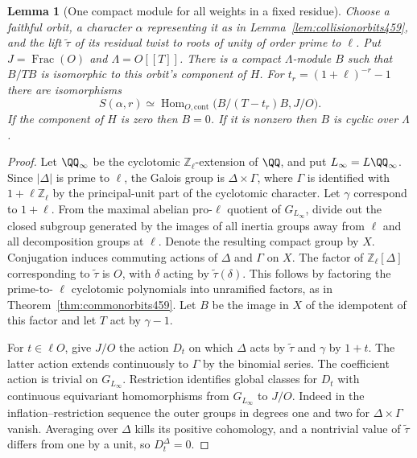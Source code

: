 \documentclass[a4paper,11pt]{article}
\newtheorem{lemma}[proposition]{Lemma}
\theoremstyle{definition}
\theoremstyle{remark}
\newcommand{\ZZ}{\mathbb Z}\newcommand{\ord}{\operatorname{ord}}
\numberwithin{equation}{section}
\begin{document}
\begin{lemma}[One compact module for all weights in a fixed residue]\leavevmode
\label{lem:collisionfamily464}
Choose a faithful orbit, a character \(\alpha\) representing it as
in Lemma~\ref{lem:collisionorbits459}, and the lift
\(\widetilde\tau\) of its residual twist to roots of unity of
order prime to \(\ell\). Put \(J=\operatorname{Frac}(O)\) and
\(\Lambda=O[[T]]\). There is a compact \(\Lambda\)-module \(B\)
such that \(B/TB\) is isomorphic to this orbit's component of
\(H\). For \(t_r=(1+\ell)^{-r}-1\) there are isomorphisms
\[
  S(\alpha,r)\simeq
       \operatorname{Hom}_{O,\mathrm{cont}}
                 \bigl(B/(T-t_r)B,J/O\bigr).
\]
If the component of \(H\) is zero then \(B=0\). If it is nonzero
then \(B\) is cyclic over \(\Lambda\).
\end{lemma}
\begin{proof}
Let \(\QQ_\infty\) be the cyclotomic \(\ZZ_\ell\)-extension of
\(\QQ\), and put \(L_\infty=L\QQ_\infty\). Since \(|\Delta|\) is
prime to \(\ell\), the Galois group is
\(\Delta\times\Gamma\), where \(\Gamma\) is identified with
\(1+\ell\ZZ_\ell\) by the principal-unit part of the cyclotomic
character. Let \(\gamma\) correspond to \(1+\ell\). From the
maximal abelian pro-\(\ell\) quotient of \(G_{L_\infty}\), divide
out the closed subgroup generated by the images of all inertia
groups away from \(\ell\) and all decomposition groups at
\(\ell\). Denote the resulting compact group by \(X\). Conjugation
induces commuting actions of \(\Delta\) and \(\Gamma\) on \(X\).
The factor of \(\ZZ_\ell[\Delta]\) corresponding to
\(\widetilde\tau\) is \(O\), with \(\delta\) acting by
\(\widetilde\tau(\delta)\). This follows by factoring the prime-to-
\(\ell\) cyclotomic polynomials into unramified factors, as in
Theorem~\ref{thm:commonorbits459}. Let \(B\) be the image in
\(X\) of the idempotent of this factor and let \(T\) act by
\(\gamma-1\).

For \(t\in\ell O\), give \(J/O\) the action \(D_t\) on which
\(\Delta\) acts by \(\widetilde\tau\) and \(\gamma\) by \(1+t\).
The latter action extends continuously to \(\Gamma\) by the
binomial series. The coefficient action is trivial on
\(G_{L_\infty}\). Restriction identifies global classes for \(D_t\)
with continuous equivariant homomorphisms from \(G_{L_\infty}\)
to \(J/O\). Indeed in the inflation--restriction sequence the
outer groups in degrees one and two for \(\Delta\times\Gamma\)
vanish. Averaging over \(\Delta\) kills its positive cohomology,
and a nontrivial value of \(\widetilde\tau\) differs from one by
a unit, so \(D_t^\Delta=0\).


\end{proof}
\end{document}
